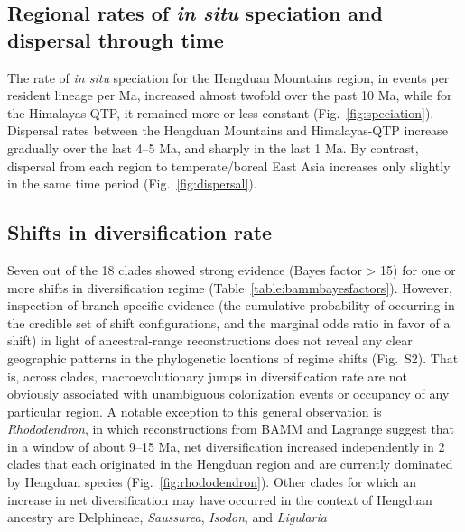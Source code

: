 \subsection{Regional rates of \textit{in situ} speciation and dispersal through time}

The rate of \textit{in situ} speciation for the Hengduan Mountains region, in events per resident lineage per Ma, increased almost twofold over the past 10 Ma, while for the Himalayas-QTP, it remained more or less constant (Fig.~\ref{fig:speciation}). Dispersal rates between the Hengduan Mountains and Himalayas-QTP increase gradually over the last 4--5 Ma, and sharply in the last 1 Ma. By contrast, dispersal from each region to temperate/boreal East Asia increases only slightly in the same time period (Fig.~\ref{fig:dispersal}).

\subsection{Shifts in diversification rate}

Seven out of the 18 clades showed strong evidence (Bayes factor > 15) for one or more shifts in diversification regime (Table~\ref{table:bammbayesfactors}). However, inspection of branch-specific evidence (the cumulative probability of occurring in the credible set of shift configurations, and the marginal odds ratio in favor of a shift) in light of ancestral-range reconstructions does not reveal any clear geographic patterns in the phylogenetic locations of regime shifts (Fig.~S2). That is, across clades, macroevolutionary jumps in diversification rate are not obviously associated with unambiguous colonization events or occupancy of any particular region. A notable exception to this general observation is \emph{Rhododendron}, in which reconstructions from BAMM and Lagrange suggest that  in a window of about 9--15 Ma, net diversification increased independently in 2 clades that each originated in the Hengduan region and are currently dominated by Hengduan species (Fig.~\ref{fig:rhododendron}). Other clades for which an increase in net diversification may have occurred in the context of Hengduan ancestry are Delphineae, \emph{Saussurea}, \emph{Isodon}, and \emph{Ligularia}


